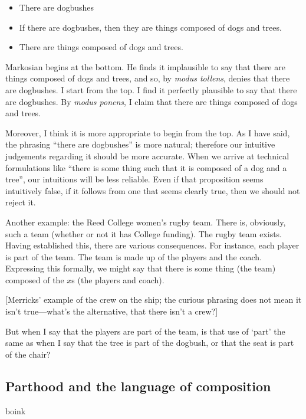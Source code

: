 \documentclass[11pt]{article}
\begin{document}
\begin{spacing}{1.25}
\begin{itemize}
  \item There are dogbushes
  \item If there are dogbushes, then they are things composed of dogs
    and trees.
  \item There are things composed of dogs and trees.
\end{itemize}

Markosian begins at the bottom.  He finds it implausible to say that
there are things composed of dogs and trees, and so, by {\em modus
  tollens}, denies that there are dogbushes.  I start from the top.  I
find it perfectly plausible to say that there are dogbushes.  By {\em
  modus ponens}, I claim that there are things composed of dogs and
trees.

Moreover, I think it is more appropriate to begin from the top.  As I
have said, the phrasing ``there are dogbushes'' is more natural;
therefore our intuitive judgements regarding it should be more
accurate.  When we arrive at technical formulations like ``there is
some thing such that it is composed of a dog and a tree'', our
intuitions will be less reliable.  Even if that proposition seems
intuitively false, if it follows from one that seems clearly true,
then we should not reject it.

Another example: the Reed College women's rugby team.  There is,
obviously, such a team (whether or not it has College funding).  The
rugby team exists.  Having established this, there are various
consequences.  For instance, each player is part of the team.  The
team is made up of the players and the coach.  Expressing this
formally, we might say that there is some thing (the team) composed of
the $x$s (the players and coach).

[Merricks' example of the crew on the ship; the curious phrasing does
  not mean it isn't true---what's the alternative, that there isn't a
  crew?]

But when I say that the players are part of the team, is that use of
`part' the same as when I say that the tree is part of the dogbush, or
that the seat is part of the chair?

\subsection{Parthood and the language of composition}
boink


\end{spacing}
\end{document}
